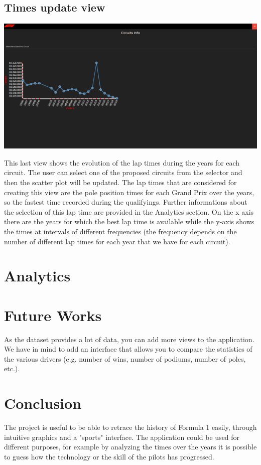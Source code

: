 \documentclass[10pt,twocolumn,letterpaper]{article}
\begin{document}
\subsection{Times update view}
\begin{center}
	\centering
	\includegraphics[width=\columnwidth]{timesupdate}
\end{center}
This last view shows the evolution of the lap times during the years for each circuit. The user can select one of the proposed circuits from the selector and then the scatter
plot will be updated. The lap times that are considered for creating this view are the pole position times for each Grand Prix over the years, so the fastest time
recorded during the qualifyings. Further informations about the selection of this lap time are provided in the Analytics section. On the x axis there are the years for which the
best lap time is available while the y-axis shows the times at intervals of different frequencies (the frequency depends on the number of different lap times for each year that
we have for each circuit).

\section{Analytics}


\section{Future Works}
As the dataset provides a lot of data, you can add more views to the application. We have in mind to add an interface that allows you to compare the statistics of the various drivers (e.g. number of wins, number of podiums, number of poles, etc.). 

\section{Conclusion}
The project is useful to be able to retrace the history of Formula 1 easily, through intuitive graphics and a "sports" interface. The application could be used for different purposes, for example by analyzing the times over the years it is possible to guess how the technology or the skill of the pilots has progressed.
\end{document}
